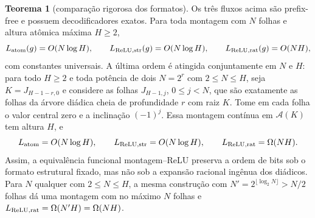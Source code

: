 \documentclass[12pt,a4paper]{article}
\theoremstyle{preciso}
\theoremstyle{definition}
\newcommand{\Aclass}{\mathcal{A}}
\theoremstyle{preciso}
\newtheorem{theorem}[teorema]{Teorema}
\theoremstyle{preciso}
\theoremstyle{preciso}
\theoremstyle{preciso}
\theoremstyle{definition}
\theoremstyle{preciso}
\theoremstyle{definition}
\theoremstyle{preciso}
\theoremstyle{preciso}
\theoremstyle{definition}
\begin{document}
\begin{theorem}[comparação rigorosa dos formatos]\label{map:artigo_2:3.12}
\label{artigo_2:thm:coding-formats}
Os três fluxos acima são prefix-free e possuem decodificadores exatos. Para
toda montagem com $N$ folhas e altura atômica máxima $H\ge2$,
\begin{equation}
 L_{\rm atom}(g)=O(N\log H),\qquad
 L_{\rm ReLU,str}(g)=O(N\log H),\qquad
 L_{\rm ReLU,rat}(g)=O(NH),
 \label{artigo_2:eq:coding-format-orders}
\end{equation}
com constantes universais. A última ordem é atingida conjuntamente em $N$ e
$H$: para todo $H\ge2$ e toda potência de dois $N=2^r$ com $2\le N\le H$, seja
$K=J_{H-1-r,0}$ e considere as folhas $J_{H-1,j}$, $0\le j<N$, que são
exatamente as folhas da árvore diádica cheia de profundidade $r$ com raiz $K$.
Tome em cada folha o valor central zero e a inclinação $(-1)^j$.
Essa montagem contínua em $\Aclass(K)$ tem altura $H$, e
\begin{equation}
 L_{\rm atom}=O(N\log H),\qquad
 L_{\rm ReLU,str}=O(N\log H),\qquad
 L_{\rm ReLU,rat}=\Omega(NH).
 \label{artigo_2:eq:coding-gap-family}
\end{equation}
Assim, a equivalência funcional montagem--ReLU preserva a ordem de bits sob o
formato estrutural fixado, mas não sob a expansão racional ingênua dos
diádicos. Para $N$ qualquer com $2\le N\le H$, a mesma construção com
$N'=2^{\lfloor\log_2N\rfloor}>N/2$ folhas dá uma montagem com no máximo $N$
folhas e $L_{\rm ReLU,rat}=\Omega(N'H)=\Omega(NH)$.
\end{theorem}
\end{document}

